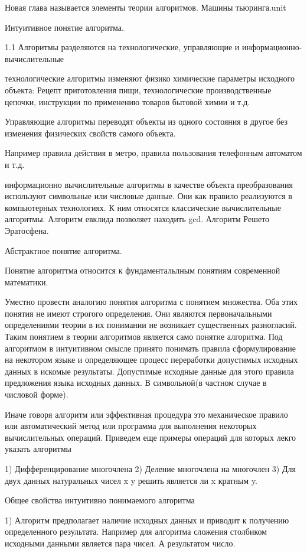 Новая глава называется элементы теории алгоритмов. Машины тьюринга.unit

Интуитивное понятие алгоритма.

1.1 Алгоритмы разделяются на технологические, управляющие и информационно-вычислительные

технологические алгоритмы изменяют физико химические параметры исходного объекта:
Рецепт приготовления пищи, технологические производственные цепочки, инструкции по применению товаров бытовой химии и т.д.

Управляющие алгоритмы переводят объекты из одного состояния в другое без изменения физических свойств самого объекта.

Например правила действия в метро, правила пользования телефонным автоматом и т.д.

информационно вычислительные алгоритмы в качестве объекта преобразования используют символьные или числовые данные. Они как правило реализуются в компьютерных технологиях. К ним относятся классические вычислительные алгоритмы. Алгоритм евклида позволяет находить gcd. Алгоритм Решето Эратосфена.

Абстрактное понятие алгоритма.

Понятие алгориттма относится к фундаментальлным понятиям современной математики.

Уместно провести аналогию понятия алгоритма с понятием множества. Оба этих понятия не имеют строгого определения. Они являются первоначальными определениями теории в их понимании не возникает существенных разногласий. Таким понятием в теории алгоритмов является само понятие алгоритма. Под алгоритмом в интуитивном смысле принято понимать правила сформулирование на некотором языке и определяющее процесс переработки допустимых исходных данных в искомые результаты. Допустимые исходные данные для этого правила предложения языка исходных данных. В символьной(в частном случае в числовой форме).

Иначе говоря алгоритм или эффективная процедура это механическое правило или автоматический метод или программа для выполнения некоторых вычислительных операций.
Приведем еще примеры операций для которых лекго указать алгоритмы

1) Дифференцирование многочлена
2) Деление многочлена на многочлен
3) Для двух данных натуральных чисел x y решить является ли x кратным y.

Общее свойства интуитивно понимаемого алгоритма

1) Алгоритм предполагает наличие исходных данных и приводит к получению определенного результата. Например для алгоритма сложения столбиком исходными данными является пара чисел. А результатом число.

